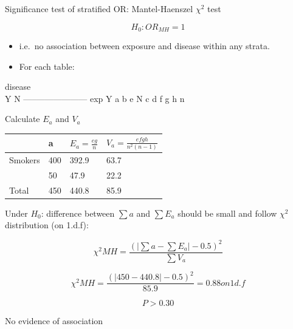 \documentclass[ignorenonframetext,]{beamer}
\begin{document}
\begin{frame}{Significance test of stratified OR: Mantel-Haenszel
\(\chi^2\) test}

\[
H_0: OR_{MH}=1
\]

\begin{itemize}
\itemsep1pt\parskip0pt
\item
  i.e.~no association between exposure and disease within any strata.
\item
  For each table:
\end{itemize}

\textbar{} \textbar{} \textbar{} disease \textbar{} \textbar{}
\textbar{}\\\textbar{} \textbar{} \textbar{} Y \textbar{} N \textbar{}
\textbar{}
\textbar{}-----\textbar{}---\textbar{}---------\textbar{}---\textbar{}---\textbar{}
\textbar{} exp \textbar{} Y \textbar{} a \textbar{} b \textbar{} e
\textbar{} \textbar{} \textbar{} N \textbar{} c \textbar{} d \textbar{}
f \textbar{} \textbar{} \textbar{} \textbar{} g \textbar{} h \textbar{}
n \textbar{}

\end{frame}

\begin{frame}{Calculate \(E_a\) and \(V_a\)}

\begin{longtable}[c]{@{}llll@{}}
\toprule
& a & \(E_a=\frac{eg}{n}\) &
\(V_a=\frac{efgh}{n^2(n-1)}\)\tabularnewline
\midrule
\endhead
Smokers & 400 & 392.9 & 63.7\tabularnewline
& 50 & 47.9 & 22.2\tabularnewline
Total & 450 & 440.8 & 85.9\tabularnewline
\bottomrule
\end{longtable}

Under \(H_0\): difference between \(\sum{a}\) and \(\sum{E_a}\) should
be small and follow \(\chi^2\) distribution (on 1.d.f):

\[
\chi^2 MH = \frac{{(| \sum{a}- \sum{E_a}| - 0.5)}^2}{\sum V_a}
\]

\[
\chi^2 MH = \frac{{(| 450- 440.8| - 0.5)}^2}{85.9} = 0.88 on 1 d.f
\]

\end{frame}

\begin{frame}

\[
P>0.30
\]

No evidence of association

\end{frame}
\end{document}
